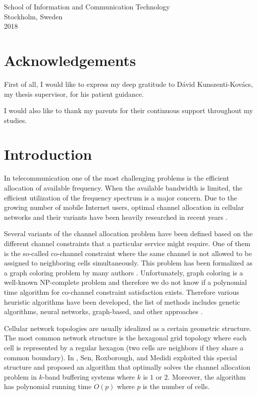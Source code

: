 \documentclass[a4paper, 12pt]{article}
\begin{document}
\begin{center}
\begin{figure}[!h]
\begin{center}
\end{center}
\end{figure}
{\large  School of Information and Communication Technology \\ \vspace{0.5cm}
Stockholm, Sweden\\2018}
\end{center}

\pagebreak
{}
\section*{Acknowledgements}
First of all, I would like to express my deep gratitude to Dávid Kunszenti-Kovács, my thesis supervisor, for his patient guidance.

I would also like to thank my parents for their continuous support throughout my studies.
\newpage
\tableofcontents
\newpage
{}
\section{Introduction}
In telecommunication one of the most challenging problems is the efficient allocation of available frequency. When the available bandwidth is limited, the efficient utilization of the frequency spectrum is a major concern. Due to the growing number of mobile Internet users, optimal channel allocation in cellular networks and their variants have been heavily researched in recent years \cite{Audhya:2011:SCA:1988563.1988571}.

Several variants of the channel allocation problem have been defined based on the different channel constraints that a particular service might require. One of them is the so-called co-channel constraint where the same channel is not allowed to be assigned to neighboring cells simultaneously. This problem has been formalized as a graph coloring problem by many authors \cite{1456167}. Unfortunately, graph coloring is a well-known NP-complete problem \cite{Kar72} and therefore we do not know if a polynomial time algorithm for co-channel constraint satisfaction exists. Therefore various heuristic algorithms have been developed, the list of methods includes genetic algorithms, neural networks, graph-based, and other approaches \cite{Audhya:2011:SCA:1988563.1988571}.

Cellular network topologies are usually idealized as a certain geometric structure. The most common network structure is the hexagonal grid topology where each cell is represented by a regular hexagon (two cells are neighbors if they share a common boundary). In \cite{662943}, Sen, Roxborough, and Medidi exploited this special structure and proposed an algorithm that optimally solves the channel allocation problem in $k$-band buffering systems where $k$ is $1$ or $2$. Moreover, the algorithm has polynomial running time $O(p)$ where $p$ is the number of cells.
\end{document}
